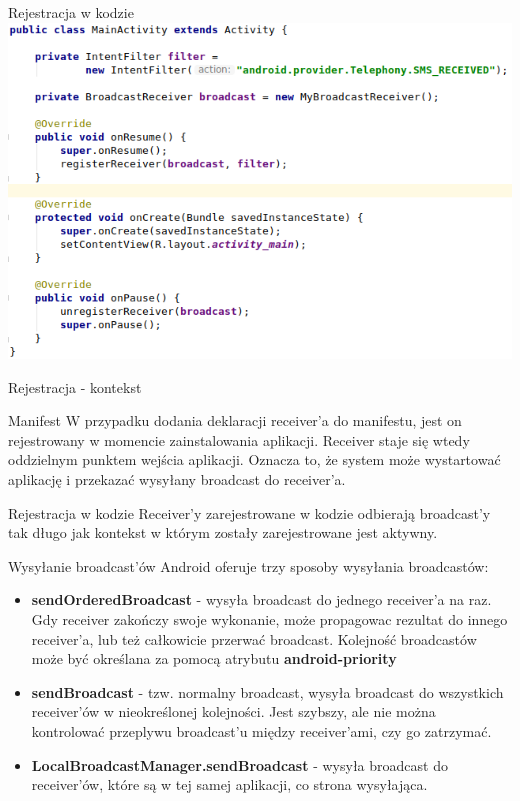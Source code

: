 \documentclass{beamer}
\begin{document}
\begin{frame}{Rejestracja w kodzie}
	\centering
	\includegraphics[height=0.7\textheight]{code-registration}
\end{frame}

\begin{frame}{Rejestracja - kontekst}
	\begin{block}{Manifest}
		W przypadku dodania deklaracji receiver'a do manifestu, jest on rejestrowany w momencie zainstalowania aplikacji. Receiver staje się wtedy oddzielnym punktem wejścia aplikacji. Oznacza to, że system może wystartować aplikację i przekazać wysyłany broadcast do receiver'a.
	\end{block}
	\begin{block}{Rejestracja w kodzie}
		Receiver'y zarejestrowane w kodzie odbierają broadcast'y tak długo jak kontekst w którym zostały zarejestrowane jest aktywny.
	\end{block}
\end{frame}

\begin{frame}{Wysyłanie broadcast'ów}
	Android oferuje trzy sposoby wysyłania broadcastów:
	\begin{itemize}
		\item<1-> \textbf{sendOrderedBroadcast} - wysyła broadcast do jednego receiver'a na raz. Gdy receiver zakończy 	swoje wykonanie, może propagowac rezultat do innego receiver'a, lub też całkowicie przerwać broadcast.	Kolejność broadcastów może być określana za pomocą atrybutu \textbf{android-priority}
		\item<2-> \textbf{sendBroadcast} - tzw. normalny broadcast, wysyła broadcast do wszystkich receiver'ów w nieokreślonej kolejności. Jest szybszy, ale nie można kontrolować przeplywu broadcast'u między receiver'ami, czy go zatrzymać.
		\item<3-> \textbf{LocalBroadcastManager.sendBroadcast} - wysyła broadcast do receiver'ów, które są w tej samej aplikacji, co strona wysyłająca. 
	\end{itemize}
\end{frame}
\end{document}
